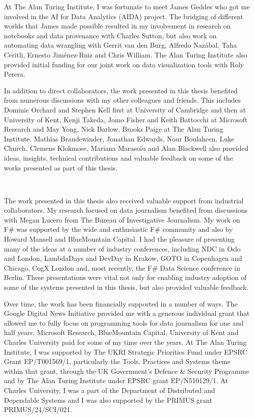 \documentclass[fleqn,11pt]{report}
\theoremstyle{definition}
\begin{document}
At The Alan Turing Institute, I was fortunate to meet James Geddes who got me involved in the
AI for Data Analytics (AIDA) project. The bridging of different worlds that James made possible
resulted in my involvement in research on notebooks and data provenance with Charles Sutton,
but also work on automating data wrangling with Gerrit van den Burg, Alfredo Naz\'abal, Taha Ceritli,
Ernesto Jim\'enez-Ruiz and Chris William. The Alan Turing Institute also provided initial funding
for our joint work on data visualization tools with Roly Perera.

In addition to direct collaborators, the work presented in this thesis benefited from numerous
discussions with my other colleagues and friends. This includes Dominic Orchard and Stephen Kell
first at University of Cambridge and then at University of Kent,
Kenji Takeda, Jomo Fisher and Keith Battocchi at Microsoft Research
and May Yong, Nick Barlow, Brooks Paige at The Alan Turing Institute.
Mathias Brandewinder, Jonathan Edwards, Nour Boulahcen, Luke Church, Clemens Klokmose,
Mariana Marasoiu and Alan Blackwell also provided ideas, insights, technical contributions
and valuable feedback on some of the works presented as part of this thesis.

~

The work presented in this thesis also received valuable support from industrial collaborators.
My research focused on data journalism benefited from discussions with
Megan Lucero from The Bureau of Investigative Journalism. My work on F\# was supported by
the wide and enthusiastic F\# community and also by Howard Mansell and BlueMountain Capital.
I had the pleasure of presenting many of the ideas at a number of industry conferences,
including NDC in Oslo and London, LambdaDays and DevDay in Krak\'ow, GOTO in Copenhagen and Chicago,
CogX London and, most recently, the F\# Data Science conference in Berlin. These presentations
were vital not only for enabling industry adoption of some of the systems presented in this thesis,
but also provided valuable feedback.

Over time, the work has been financially supported in a number of ways. The Google Digital News
Initiative provided me with a generous individual grant that allowed me to fully focus on
programming tools for data journalism for one and half years. Microsoft Research,
BlueMountain Capital, University of Kent and Charles University paid for some of my time over
the years. At The Alan Turing Institute, I was supported by The UKRI Strategic Priorities Fund
under EPSRC Grant EP/T001569/1, particularly the Tools, Practices and Systems theme within that
grant, through the UK Government's Defence \& Security Programme and by The Alan Turing Institute
under EPSRC grant EP/N510129/1. At Charles University, I was a part of the
Department of Distributed and Dependable Systems and I was also supported by the PRIMUS
grant PRIMUS/24/SCI/021.
\end{document}
